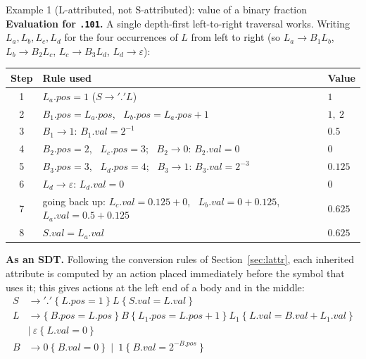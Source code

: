 \documentclass[11pt,a4paper]{article}
\newcommand{\at}[2]{\ensuremath{#1.\mathit{#2}}}
\newcommand{\tok}[1]{\ensuremath{\mathtt{#1}}}
\begin{document}
\begin{examplebox}{Example 1 (L-attributed, not S-attributed): value of a binary fraction}
\textbf{Evaluation for \texttt{.101}.} A single depth-first left-to-right traversal works. Writing $L_a, L_b, L_c, L_d$ for the four occurrences of $L$ from left to right (so $L_a\to B_1L_b$, $L_b\to B_2L_c$, $L_c\to B_3L_d$, $L_d\to\varepsilon$):
\begin{center}
\small
\begin{tabular}{@{}c l l@{}}
\toprule
\textbf{Step} & \textbf{Rule used} & \textbf{Value} \\ \midrule
1 & $\at{L_a}{pos}=1$ \quad ($S\to\tok{'.'}L$) & $1$ \\
2 & $\at{B_1}{pos}=\at{L_a}{pos}$, \ $\at{L_b}{pos}=\at{L_a}{pos}+1$ & $1,\ 2$ \\
3 & $B_1\to1$: $\at{B_1}{val}=2^{-1}$ & $0.5$ \\
4 & $\at{B_2}{pos}=2$, \ $\at{L_c}{pos}=3$; \ $B_2\to0$: $\at{B_2}{val}=0$ & $0$ \\
5 & $\at{B_3}{pos}=3$, \ $\at{L_d}{pos}=4$; \ $B_3\to1$: $\at{B_3}{val}=2^{-3}$ & $0.125$ \\
6 & $L_d\to\varepsilon$: $\at{L_d}{val}=0$ & $0$ \\
7 & going back up: $\at{L_c}{val}=0.125+0$, \ $\at{L_b}{val}=0+0.125$, \ $\at{L_a}{val}=0.5+0.125$ & $0.625$ \\
8 & $\at{S}{val}=\at{L_a}{val}$ & $0.625$ \\ \bottomrule
\end{tabular}
\end{center}
\textbf{As an SDT.} Following the conversion rules of Section~\ref{sec:lattr}, each inherited attribute is computed by an action placed immediately before the symbol that uses it; this gives actions at the left end of a body and in the middle:
\begin{align*}
S &\to \tok{'.'}\ \{\ \at{L}{pos}=1\ \}\ L\ \{\ \at{S}{val}=\at{L}{val}\ \}\\
L &\to \{\ \at{B}{pos}=\at{L}{pos}\ \}\ B\ \{\ \at{L_1}{pos}=\at{L}{pos}+1\ \}\ L_1\ \{\ \at{L}{val}=\at{B}{val}+\at{L_1}{val}\ \}\\
  &\mid\ \varepsilon\ \{\ \at{L}{val}=0\ \}\\
B &\to 0\ \{\ \at{B}{val}=0\ \}\ \mid\ 1\ \{\ \at{B}{val}=2^{-\at{B}{pos}}\ \}
\end{align*}
\end{examplebox}
\end{document}
